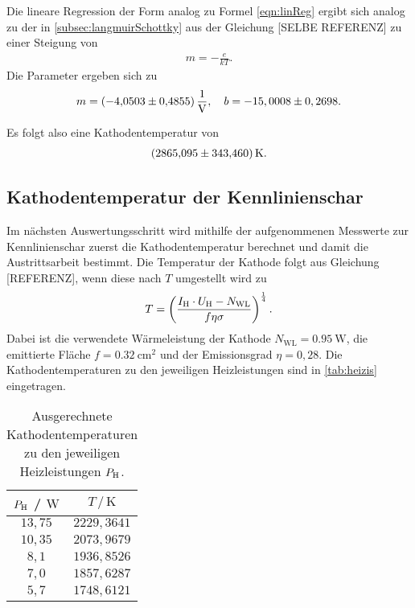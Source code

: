\noindent
Die lineare Regression der Form analog zu Formel \eqref{eqn:linReg} ergibt sich analog zu der in \autoref{subsec:langmuirSchottky} aus der Gleichung [SELBE REFERENZ] zu einer Steigung von
\begin{align}
  \label{eqn:steigung}
  m = -\frac{e}{kT}.
\end{align}
Die Parameter ergeben sich zu
\begin{align*}
  m =  \SI{-4,0503 \pm 0,4855}{\per\volt}, \quad
  b = -15,0008 \pm 0,2698.
\end{align*}

Es folgt also eine Kathodentemperatur von
\begin{align*}
  \SI{2865,095 \pm 343,460}{\kelvin}.
\end{align*}

\subsection{Kathodentemperatur der Kennlinienschar}
\label{subsec:kathodenTempSchar}

Im nächsten Auswertungsschritt wird mithilfe der aufgenommenen Messwerte zur Kennlinienschar zuerst die Kathodentemperatur berechnet und damit
die Austrittsarbeit bestimmt. Die Temperatur der Kathode folgt aus Gleichung [REFERENZ], wenn diese nach $T$ umgestellt wird zu 
\begin{align}
  T = \left(\frac{I_{\text H}\cdot U_{\text H} - N_{\text{WL}}}{f\eta\sigma}\right)^{\frac 14}.
\end{align}
Dabei ist die verwendete Wärmeleistung der Kathode $N_{\text{WL}} = \SI{0,95}{\watt}$, die emittierte Fläche $f=\SI{0,32}{\centi\meter\squared}$
und der Emissionsgrad $\eta = 0,28$. Die Kathodentemperaturen zu den jeweiligen Heizleistungen sind in \autoref{tab:heizis} eingetragen.

\begin{table}[H]
  \caption{Ausgerechnete Kathodentemperaturen zu den jeweiligen Heizleistungen $P_{\text H}$.}
  \label{tab:heizis}
  \centering
  \begin{tabular}{c c}
      \toprule
      $P_{\text H}$ / $\si{\watt}$ & $T \,/\, \si{\kelvin}$\\
      \midrule
      $13,75$ & $2229,3641$ \\
      $10,35$ & $2073,9679$ \\
      $8,1$   & $1936,8526$ \\
      $7,0$   & $1857,6287$ \\
      $5,7$   & $1748,6121$ \\
      \bottomrule
    \end{tabular}
\end{table}

